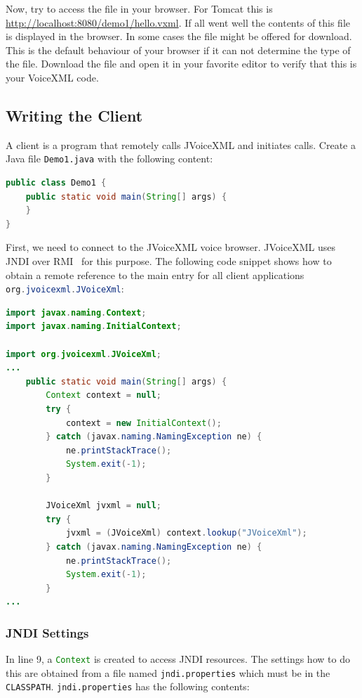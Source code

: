 \documentclass[11pt,a4paper]{article}
\begin{document}
Now, try to access the file in your browser. For Tomcat this is
\url{http://localhost:8080/demo1/hello.vxml}. If all went well the
contents of this file is displayed in the browser. In some cases the file
might be offered for download. This is the default behaviour of your browser if
it can not determine the type of the file. Download the file and open it in your
favorite editor to verify that this is your VoiceXML code.

\subsection{Writing the Client}

A client is a program that remotely calls JVoiceXML and initiates calls. Create 
a Java file \texttt{Demo1.java} with the following content:

\begin{lstlisting}[language=Java]
public class Demo1 {
    public static void main(String[] args) {
    }
}
\end{lstlisting}

First, we need to connect to the JVoiceXML voice browser. JVoiceXML
uses JNDI over RMI~\cite{sun:rmi,sun:rmi_jndi} for this purpose. 
The following code snippet
shows how to obtain a remote reference to the main entry for
all client applications \lstinline[language=Java]{org.jvoicexml.JVoiceXml}:

\begin{lstlisting}[language=Java]
import javax.naming.Context;
import javax.naming.InitialContext;

import org.jvoicexml.JVoiceXml;
...
    public static void main(String[] args) {
        Context context = null;
        try {
            context = new InitialContext();
        } catch (javax.naming.NamingException ne) {
            ne.printStackTrace();
            System.exit(-1);
        }

        JVoiceXml jvxml = null;
        try {
            jvxml = (JVoiceXml) context.lookup("JVoiceXml");
        } catch (javax.naming.NamingException ne) {
            ne.printStackTrace();
            System.exit(-1);
        }
...
\end{lstlisting}

\subsubsection{JNDI Settings}

In line 9, a \lstinline[language=Java]{Context} is created to access JNDI resources.
The settings how to do this are obtained from a file named
\texttt{jndi.properties} which must be in the \texttt{CLASSPATH}.
\texttt{jndi.properties} has the following contents:
\end{document}
